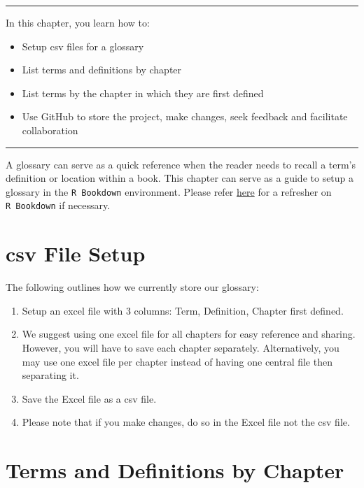 \documentclass[
]{book}
\providecommand{\tightlist}{%
  \setlength{\itemsep}{0pt}\setlength{\parskip}{0pt}}
\begin{document}
\begin{center}\rule{0.5\linewidth}{0.5pt}\end{center}

In this chapter, you learn how to:

\begin{itemize}
\tightlist
\item
  Setup csv files for a glossary
\item
  List terms and definitions by chapter
\item
  List terms by the chapter in which they are first defined
\item
  Use GitHub to store the project, make changes, seek feedback and facilitate collaboration
\end{itemize}

\begin{center}\rule{0.5\linewidth}{0.5pt}\end{center}

A glossary can serve as a quick reference when the reader needs to recall a term's definition or location within a book. This chapter can serve as a guide to setup a glossary in the \texttt{R\ Bookdown} environment. Please refer \href{https://bookdown.org/yihui/bookdown/get-started.html}{here} for a refresher on \texttt{R\ Bookdown} if necessary.

\hypertarget{csv-file-setup}{%
\section{csv File Setup}\label{csv-file-setup}}

The following outlines how we currently store our glossary:

\begin{enumerate}
\def\labelenumi{\arabic{enumi}.}
\tightlist
\item
  Setup an excel file with 3 columns: Term, Definition, Chapter first defined.
\item
  We suggest using one excel file for all chapters for easy reference and sharing. However, you will have to save each chapter separately. Alternatively, you may use one excel file per chapter instead of having one central file then separating it.
\item
  Save the Excel file as a csv file.
\item
  Please note that if you make changes, do so in the Excel file not the csv file.
\end{enumerate}

\hypertarget{terms-and-definitions-by-chapter}{%
\section{Terms and Definitions by Chapter}\label{terms-and-definitions-by-chapter}}
\end{document}
